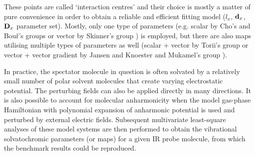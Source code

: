 \documentclass[b5paper,oneside,fleqn,11pt]{book}
\begin{document}
\begin{refsection}
These points are called `interaction centres' and their
choice is mostly a matter of pure convenience in order to obtain a reliable and efficient
fitting model ($l_x$, ${\bf d}_x$, ${\bf D}_x$ parameter set). Mostly, only one type of parameters
(e.g. scalar by Cho's and Bou\v{r}'s groups \citep{Kwac.Cho.II.JCP.2003,Ham.Kim.Lee.Cho.JCP.2003,
Bour.Keiderling.JCP.2003,Hahn.Lee.Cho.JCP.2004,Kwac.Lee.Cho.JCP.2004,
Choi.Hahn.Cho.IJQC.2005,Kwac.Cho.JRS.2005,
Choi.Oh.Lee.Lee.Cho.JCP.2008,Oh.Choi.Lee.Han.Lee.Cho.JCP.2008,
Choi.Oh.Cho.JCP.2008,Lee.Choi.Cho.PCCP.2010,Choi.Cho.JCP.2011,
Choi.Raleigh.Cho.JCPL.2011,Lee.Choi.Cho.JCP.2012}
or vector by Skinner's group \citep{Schmidt.Corcelli.Skinner.JCP.2004,
Corcelli.Lawrence.Skinner.JCP.2004}) is employed, but there are also maps utilising multiple types of parameters
as well (scalar + vector by Torii's group \citep{Torii.JCPL.2015,Torii.Noge.PCCP.2016} 
or vector + vector gradient by Jansen and Knoester \citep{Jansen.Knoester.JCP.2006}
and Mukamel's group \citep{Hayashi.Jansen.Zhuang.Mukamel.JPCA.2005,Hayashi.Zhuang.Mukamel.JPCA.2005}).
 
In practice, the spectator molecule in question is often solvated by a relatively small number of polar 
solvent molecules that create varying electrostatic potential. \citep{Bour.Keiderling.JCP.2003,
Lin.Shorb.Mukherjee.Zanni.Skinner.JPCB.2009,
Lee.Choi.Cho.JCP.2012} 
The perturbing fields can also be applied directly
in many directions. \citep{Jansen.Dijkstra.Watson.Hirst.Knoester.JCP.2006,
Jansen.Knoester.JCP.2006,Roy.Lessing.Meisl.Ganim.Tokmakoff.Knoester.Jansen.JCP.2011,
Hayashi.Jansen.Zhuang.Mukamel.JPCA.2005,
Hayashi.Zhuang.Mukamel.JPCA.2005,Bour.Michalik.Kapitan.JCP.2005} 
It is also possible to account for molecular anharmonicity
when the model gas\hyp{}phase Hamiltonian with polynomial expansion of anharmonic potential
is used and perturbed by external electric fields. \citep{Jansen.Knoester.JCP.2006}
Subsequent multivariate
least-square analyses of these model systems are then performed to obtain the vibrational 
solvatochromic parameters (or maps) for a given IR probe molecule, from which the benchmark
results could be reproduced. 


\end{refsection}
\end{document}
